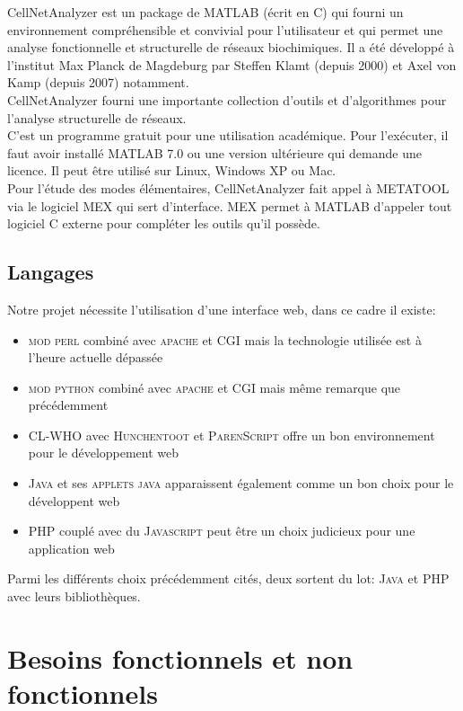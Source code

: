 \documentclass[12pt,a4paper]{report}
\begin{document}
\noindent CellNetAnalyzer est un package de MATLAB (écrit en \textsc{C}) qui fourni un environnement compréhensible et convivial pour l'utilisateur et qui permet une analyse fonctionnelle et structurelle de réseaux biochimiques. Il a été développé à l'institut Max Planck de Magdeburg par Steffen Klamt (depuis 2000) et Axel von Kamp (depuis 2007) notamment.\\
CellNetAnalyzer fourni une importante collection d'outils et d'algorithmes pour l'analyse structurelle de réseaux.\\
C'est un programme gratuit pour une utilisation académique. Pour l'exécuter, il faut avoir installé MATLAB 7.0 ou une version ultérieure qui demande une licence. Il peut être utilisé sur Linux, Windows XP ou Mac.\\
Pour l'étude des modes élémentaires, CellNetAnalyzer fait appel à METATOOL via le logiciel MEX qui sert d'interface. MEX permet à MATLAB d'appeler tout logiciel \textsc{C} externe pour compléter les outils qu'il possède.

\section{Langages}

\noindent Notre projet nécessite l'utilisation d'une interface web, dans ce cadre il existe:
\begin{itemize}
\item \textsc{mod perl} combiné avec \textsc{apache} et \textsc{CGI} mais la technologie utilisée est à l'heure actuelle dépassée
\item \textsc{mod python} combiné avec \textsc{apache} et \textsc{CGI} mais même remarque que précédemment
\item \textsc{CL-WHO} avec \textsc{Hunchentoot} et \textsc{ParenScript} offre un bon environnement pour le développement web
\item \textsc{Java} et ses \textsc{applets java} apparaissent également comme un bon choix pour le développent web
\item \textsc{PHP} couplé avec du \textsc{Javascript} peut être un choix judicieux pour une application web\\
\end{itemize}

\noindent Parmi les différents choix précédemment cités, deux sortent du lot: \textsc{Java} et \textsc{PHP} avec leurs bibliothèques.

\chapter{Besoins fonctionnels et non fonctionnels}
\end{document}
